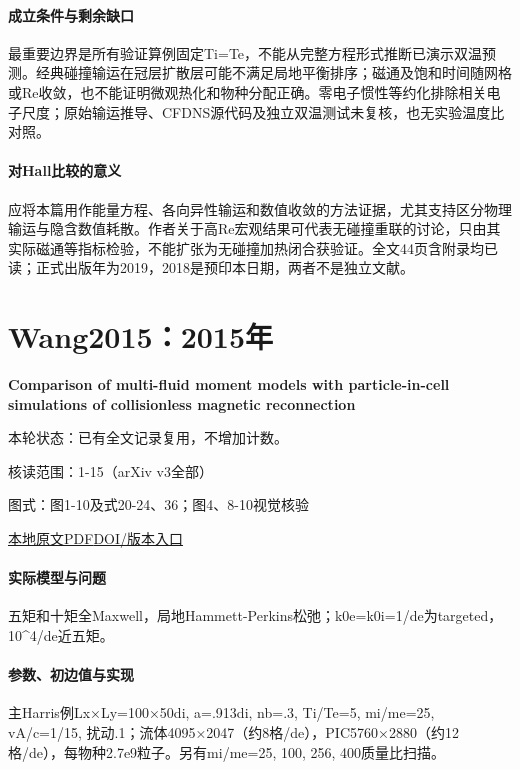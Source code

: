 \paragraph{成立条件与剩余缺口}最重要边界是所有验证算例固定Ti=Te，不能从完整方程形式推断已演示双温预测。经典碰撞输运在冠层扩散层可能不满足局地平衡排序；磁通及饱和时间随网格或Re收敛，也不能证明微观热化和物种分配正确。零电子惯性等约化排除相关电子尺度；原始输运推导、CFDNS源代码及独立双温测试未复核，也无实验温度比对照。

\paragraph{对Hall比较的意义}应将本篇用作能量方程、各向异性输运和数值收敛的方法证据，尤其支持区分物理输运与隐含数值耗散。作者关于高Re宏观结果可代表无碰撞重联的讨论，只由其实际磁通等指标检验，不能扩张为无碰撞加热闭合获验证。全文44页含附录均已读；正式出版年为2019，2018是预印本日期，两者不是独立文献。

\section{Wang2015：2015年}\label{paper:Wang2015}

\textbf{Comparison of multi-fluid moment models with particle-in-cell simulations of collisionless magnetic reconnection}\citep{Wang2015}

\textsf{本轮状态：}已有全文记录复用，不增加计数。

\textsf{核读范围：}1-15（arXiv v3全部）\par\textsf{图式：}图1-10及式20-24、36；图4、8-10视觉核验

\href{run:../../papers/Wang2015.pdf}{本地原文PDF}\quad\href{https://doi.org/10.1063/1.4906063}{DOI/版本入口}

\paragraph{实际模型与问题}五矩和十矩全Maxwell，局地Hammett-Perkins松弛；k0e=k0i=1/de为targeted，10\textasciicircum{}4/de近五矩。

\paragraph{参数、初边值与实现}主Harris例Lx×Ly=100×50di, a=.913di, nb=.3, Ti/Te=5, mi/me=25, vA/c=1/15, 扰动.1；流体4095×2047（约8格/de），PIC5760×2880（约12格/de），每物种2.7e9粒子。另有mi/me=25, 100, 256, 400质量比扫描。

